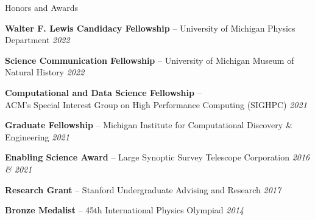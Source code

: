 \begin{rSection}{Honors and Awards} \itemsep -3pt \vspace*{-.25cm}

\item \textbf{Walter F. Lewis Candidacy Fellowship} -- University of Michigan Physics Department \hfill{\em 2022}

\item \textbf{Science Communication Fellowship} -- University of Michigan Museum of Natural History \hfill{\em 2022}

\item \textbf{Computational and Data Science Fellowship} -- \\ ACM’s Special Interest Group on High Performance Computing (SIGHPC) \hfill {\em 2021}

\item \textbf{Graduate Fellowship} -- Michigan Institute for Computational Discovery \& Engineering  \hfill {\em 2021}

\item \textbf{Enabling Science Award} -- Large Synoptic Survey Telescope Corporation \hfill {\em 2016 \& 2021}

\item \textbf{Research Grant} -- Stanford Undergraduate Advising and Research \hfill {\em 2017}

\item \textbf{Bronze Medalist} -- 45th International Physics Olympiad \hfill {\em 2014}
\end{rSection}



